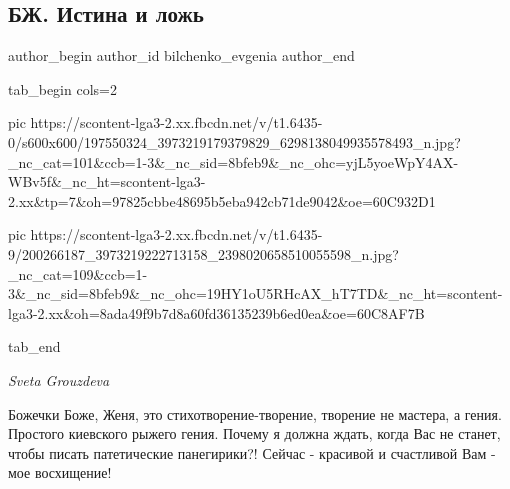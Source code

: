 
 
 
 
 
 
\subsection{БЖ. Истина и ложь}
\label{sec:12_06_2021.fb.bilchenko_evgenia.6.istina_i_lozh}
\ifcmt
 author_begin
   author_id bilchenko_evgenia
 author_end
\fi

\ifcmt
  tab_begin cols=2

     pic https://scontent-lga3-2.xx.fbcdn.net/v/t1.6435-0/s600x600/197550324_3973219179379829_6298138049935578493_n.jpg?_nc_cat=101&ccb=1-3&_nc_sid=8bfeb9&_nc_ohc=yjL5yoeWpY4AX-WBv5f&_nc_ht=scontent-lga3-2.xx&tp=7&oh=97825cbbe48695b5eba942cb71de9042&oe=60C932D1

     pic https://scontent-lga3-2.xx.fbcdn.net/v/t1.6435-9/200266187_3973219222713158_2398020658510055598_n.jpg?_nc_cat=109&ccb=1-3&_nc_sid=8bfeb9&_nc_ohc=19HY1oU5RHcAX_hT7TD&_nc_ht=scontent-lga3-2.xx&oh=8ada49f9b7d8a60fd36135239b6ed0ea&oe=60C8AF7B

  tab_end
\fi

\emph{Sveta Grouzdeva}

Божечки Боже, Женя, это стихотворение-творение, творение не мастера, а гения.
Простого киевского рыжего гения. Почему я должна ждать, когда Вас не станет,
чтобы писать патетические панегирики?! Сейчас - красивой и счастливой Вам - мое
восхищение!

